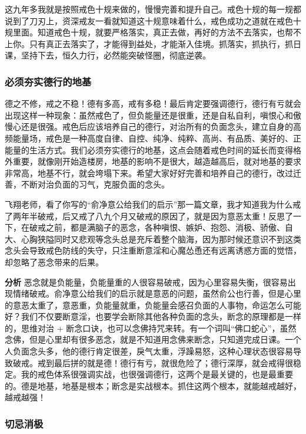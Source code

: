 这九年多我就是按照戒色十规来做的，慢慢完善和提升自己。戒色十规的每一规都说到了刀刃上，资深戒友一看就知道这十规意味着什么，戒色成功之道就在戒色十规里面。知道戒色十规，就要严格落实，真正去做，再好的方法不去落实，也帮不上你。只有真正去落实了，才能得到益处，才能渐入佳境。抓落实，抓执行，抓日课，坚持下去，恒久力行，必然能突破怪圈，彻底逆袭。

\subsubsection{必须夯实德行的地基}

德之不修，戒之不稳！德有多高，戒有多稳！最后肯定要强调德行，德行有亏就会出现这样一种现象：虽然戒色了，但负能量还是很重，还是自私自利，嗔恨心和傲慢心还是很强。戒色后应该培养自己的德行，对治所有的负面念头，建立自身的高频能量场，戒色是一种高度自律、自控、纯净、纯粹、高尚、有品质、美好的、正能量的生活方式。我们必须夯实德行的地基，这点会随着戒色时间的延长而变得格外重要，就像刚开始造楼房，地基的影响不是很大，越造越高后，就对地基的要求非常高，地基不行，就会垮塌下来。希望大家好好完善和培养自己的德行，改过迁善，不断对治负面的习气，克服负面的念头。

\begin{case}
    飞翔老师，看了你写的“俞净意公给我们的启示”那一篇文章，我才知道我为什么戒了两年半破戒，后又戒了八九个月又破戒的原因了，就是因为意恶太重！反思了一下，在破戒之前，都是满脑子的恶念，各种嗔恨、嫉妒、抱怨、消极、骄傲、自大、心胸狭隘同时又悲观等念头总是充斥着整个脑海，因为那时候还意识不到这类念头会导致戒色防线的失守，只注重断意淫和心魔怂恿还有远离诱惑方面的觉悟，却忽略了恶念带来的后果。

    \textbf{分析} 恶念就是负能量，负能量重的人很容易破戒，因为心里容易失衡，很容易出现情绪破戒。俞净意公给我们的启示就是意恶的问题，虽然俞公也行善，但是心里的意恶太重了，意恶重，负能量就重，负能量会感召负面的人事物，命运怎么可能好？我们不仅要断意淫，也要学会断除其他各种负面的念头，断念的原理都是一样的，思维对治 + 断念口诀，也可以念佛持咒来转。有一个词叫“佛口蛇心”，虽然念佛，但是心里却有很多恶念，就是不知道用念佛来断念，只知道完成日课。一个人负面念头多，他的德行肯定很差，戾气太重，浮躁易怒，这种心理状态很容易导致破戒。戒到最后拼的就是德！德行有亏，就很危险了；德行深厚，就会戒得很稳定。我的戒色体系很强调实战，也很强调德行，这两个是最关键的，也是最重要的。德是地基，地基是根本；断念是实战根本。抓住这两个根本，就能越戒越好，越戒越强！
\end{case}

\subsubsection{切忌消极}

